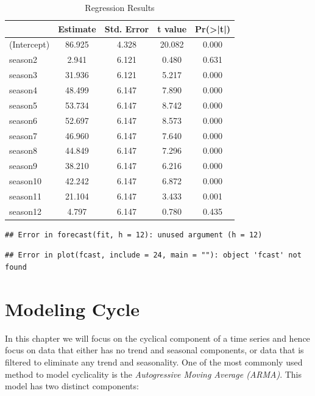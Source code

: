 \documentclass[]{book}
\theoremstyle{definition}
\theoremstyle{definition}
\theoremstyle{definition}
\theoremstyle{remark}
\begin{document}
\begin{table}[t]

\caption{\label{tab:ch5-table3}Regression Results}
\centering
\begin{tabular}{lcccc}
\toprule
  & Estimate & Std. Error & t value & Pr(>|t|)\\
\midrule
(Intercept) & 86.925 & 4.328 & 20.082 & 0.000\\
season2 & 2.941 & 6.121 & 0.480 & 0.631\\
season3 & 31.936 & 6.121 & 5.217 & 0.000\\
season4 & 48.499 & 6.147 & 7.890 & 0.000\\
season5 & 53.734 & 6.147 & 8.742 & 0.000\\
\addlinespace
season6 & 52.697 & 6.147 & 8.573 & 0.000\\
season7 & 46.960 & 6.147 & 7.640 & 0.000\\
season8 & 44.849 & 6.147 & 7.296 & 0.000\\
season9 & 38.210 & 6.147 & 6.216 & 0.000\\
season10 & 42.242 & 6.147 & 6.872 & 0.000\\
\addlinespace
season11 & 21.104 & 6.147 & 3.433 & 0.001\\
season12 & 4.797 & 6.147 & 0.780 & 0.435\\
\bottomrule
\end{tabular}
\end{table}

\begin{verbatim}
## Error in forecast(fit, h = 12): unused argument (h = 12)
\end{verbatim}

\begin{verbatim}
## Error in plot(fcast, include = 24, main = ""): object 'fcast' not found
\end{verbatim}

\hypertarget{modeling-cycle}{%
\chapter{Modeling Cycle}\label{modeling-cycle}}

In this chapter we will focus on the cyclical component of a time series and hence focus on data that either has no trend and seasonal components, or data that is filtered to eliminate any trend and seasonality. One of the most commonly used method to model cyclicality is the \emph{Autogressive Moving Average (ARMA)}. This model has two distinct components:
\end{document}
